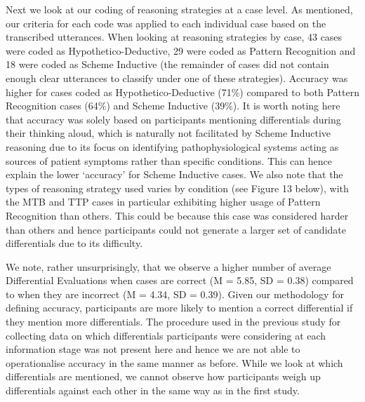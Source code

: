\documentclass[a4paper, nobind]{templates/ociamthesis}
\begin{document}
Next we look at our coding of reasoning strategies at a case level. As mentioned, our criteria for each code was applied to each individual case based on the transcribed utterances. When looking at reasoning strategies by case, 43 cases were coded as Hypothetico-Deductive, 29 were coded as Pattern Recognition and 18 were coded as Scheme Inductive (the remainder of cases did not contain enough clear utterances to classify under one of these strategies). Accuracy was higher for cases coded as Hypothetico-Deductive (71\%) compared to both Pattern Recognition cases (64\%) and Scheme Inductive (39\%). It is worth noting here that accuracy was solely based on participants mentioning differentials during their thinking aloud, which is naturally not facilitated by Scheme Inductive reasoning due to its focus on identifying pathophysiological systems acting as sources of patient symptoms rather than specific conditions. This can hence explain the lower `accuracy' for Scheme Inductive cases. We also note that the types of reasoning strategy used varies by condition (see Figure 13 below), with the MTB and TTP cases in particular exhibiting higher usage of Pattern Recognition than others. This could be because this case was considered harder than others and hence participants could not generate a larger set of candidate differentials due to its difficulty.

We note, rather unsurprisingly, that we observe a higher number of average Differential Evaluations when cases are correct (M = 5.85, SD = 0.38) compared to when they are incorrect (M = 4.34, SD = 0.39). Given our methodology for defining accuracy, participants are more likely to mention a correct differential if they mention more differentials. The procedure used in the previous study for collecting data on which differentials participants were considering at each information stage was not present here and hence we are not able to operationalise accuracy in the same manner as before. While we look at which differentials are mentioned, we cannot observe how participants weigh up differentials against each other in the same way as in the first study.
\end{document}
